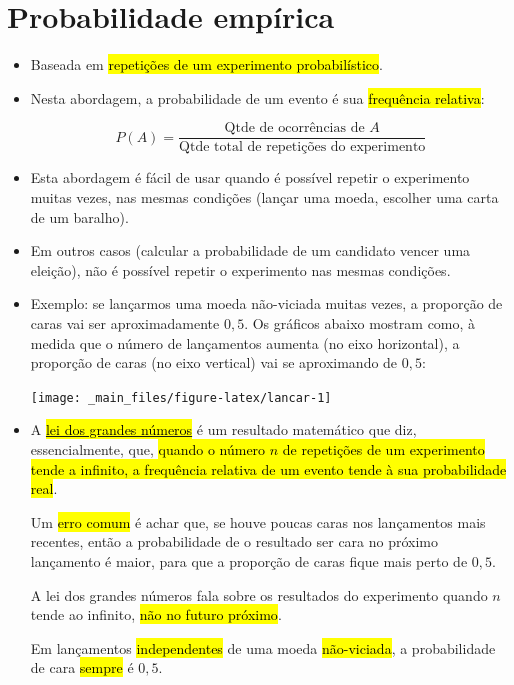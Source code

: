 \documentclass[
  11pt]{report}
\begin{document}
\hypertarget{probabilidade-empuxedrica}{%
\section{Probabilidade empírica}\label{probabilidade-empuxedrica}}

\begin{itemize}
\item
  Baseada em {\hl{repetições de um experimento probabilístico}}.
\item
  Nesta abordagem, a probabilidade de um evento é sua {\hl{frequência relativa}}:

  \[
  P(A) = \frac{\text{Qtde de ocorrências de } A}{\text{Qtde total de repetições do experimento}}
  \]
\item
  Esta abordagem é fácil de usar quando é possível repetir o experimento muitas vezes, nas mesmas condições (lançar uma moeda, escolher uma carta de um baralho).
\item
  Em outros casos (calcular a probabilidade de um candidato vencer uma eleição), não é possível repetir o experimento nas mesmas condições.
\item
  Exemplo: se lançarmos uma moeda não-viciada muitas vezes, a proporção de caras vai ser aproximadamente $0{,}5$. Os gráficos abaixo mostram como, à medida que o número de lançamentos aumenta (no eixo horizontal), a proporção de caras (no eixo vertical) vai se aproximando de $0{,}5$:

  \begin{center}\texttt{[image: \_main\_files/figure-latex/lancar-1]} \end{center}
\item
  A \href{https://pt.wikipedia.org/wiki/Lei_dos_grandes_n\%C3\%BAmeros}{{\hl{lei dos grandes números}}} é um resultado matemático que diz, essencialmente, que, {\hl{quando o número $n$ de repetições de um experimento tende a infinito, a frequência relativa de um evento tende à sua probabilidade real}}.

  Um {\hl{erro comum}} é achar que, se houve poucas caras nos lançamentos mais recentes, então a probabilidade de o resultado ser cara no próximo lançamento é maior, para que a proporção de caras fique mais perto de $0{,}5$.

  A lei dos grandes números fala sobre os resultados do experimento quando $n$ tende ao infinito, {\hl{não no futuro próximo}}.

  Em lançamentos {\hl{independentes}} de uma moeda {\hl{não-viciada}}, a probabilidade de cara {\hl{sempre}} é $0{,}5$.
\end{itemize}
\end{document}
